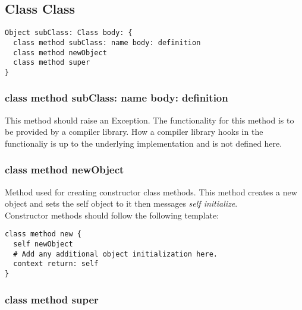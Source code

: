 \subsection{Class Class}

\begin{lstlisting}
Object subClass: Class body: {
  class method subClass: name body: definition
  class method newObject
  class method super
}
\end{lstlisting}

\subsubsection{class method subClass: name body: definition}
This method should raise an Exception. The functionality for this method
is to be provided by a compiler library. How a compiler library hooks in the
functionaliy is up to the underlying implementation and is not defined here.

\subsubsection{class method newObject}
Method used for creating constructor class methods. This method creates a new
object and sets the self object to it then messages \textit{self initialize}.\\
Constructor methods should follow the following template:

\begin{lstlisting}
class method new {
  self newObject
  # Add any additional object initialization here.
  context return: self
}
\end{lstlisting}

\subsubsection{class method super}
